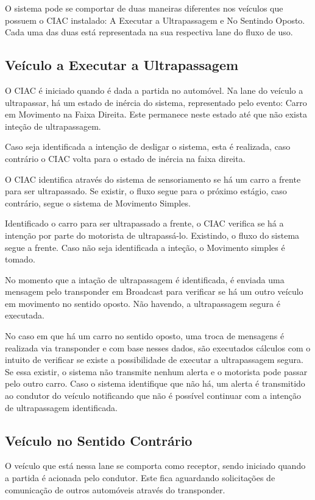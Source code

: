 O sistema pode se comportar de duas maneiras diferentes nos veículos que possuem
o CIAC instalado: A Executar a Ultrapassagem e No Sentindo Oposto. Cada uma das duas
está representada na sua respectiva lane do fluxo de uso.

\subsection{Veículo a Executar a Ultrapassagem}
O CIAC é iniciado quando é dada a partida no automóvel. Na lane do veículo a ultrapassar,
há um estado de inércia do sistema, representado pelo evento: Carro em Movimento
na Faixa Direita. Este permanece neste estado até que não exista inteção de
ultrapassagem.

Caso seja identificada a intenção de desligar o sistema, esta é realizada, caso
contrário o CIAC volta para o estado de inércia na faixa direita.

O CIAC identifica através do sistema de sensoriamento se há um carro a frente
para ser ultrapassado. Se existir, o fluxo segue para o próximo estágio, caso
contrário, segue o sistema de Movimento Simples.

Identificado o carro para ser ultrapassado a frente, o CIAC verifica se há a
intenção por parte do motorista de ultrapassá-lo. Existindo, o fluxo do sistema
segue a frente. Caso não seja identificada a inteção, o Movimento simples
é tomado.

No momento que a intação de ultrapassagem é identificada, é enviada uma mensagem
pelo transponder em Broadcast para verificar se há um outro veículo em movimento
no sentido oposto. Não havendo, a ultrapassagem segura é executada.

No caso em que há um carro no sentido oposto, uma troca de mensagens é realizada
via transponder e com base nesses dados, são executados cálculos com o intuito
de verificar se existe a possibilidade de executar a ultrapassagem segura.
Se essa existir, o sistema não transmite nenhum alerta e o motorista pode passar
pelo outro carro. Caso o sistema identifique que não há, um alerta é transmitido
ao condutor do veículo notificando que não é possível continuar com a intenção
de ultrapassagem identificada.

\subsection{Veículo no Sentido Contrário}

O veículo que está nessa lane se comporta como receptor, sendo iniciado quando
a partida é acionada pelo condutor. Este fica aguardando solicitações de
comunicação de outros automóveis através do transponder.

